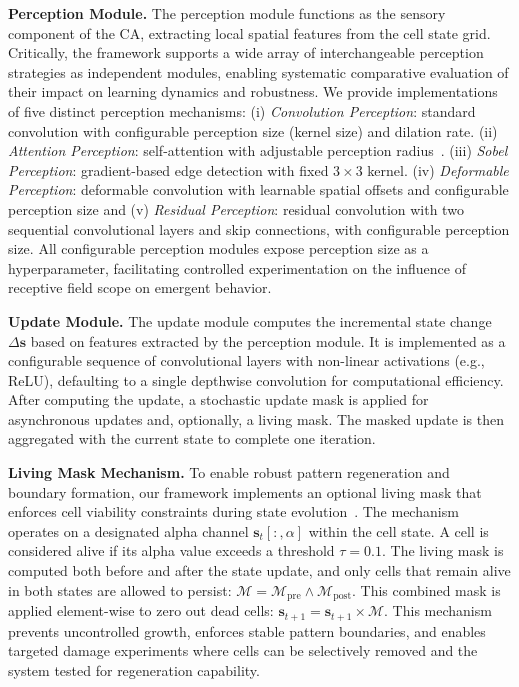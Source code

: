\documentclass[10pt]{article} %
\begin{document}
\noindent\textbf{Perception Module.}
The perception module functions as the sensory component of the CA, extracting local spatial features from the cell state grid. Critically, the framework supports a wide array of interchangeable perception strategies as independent modules, enabling systematic comparative evaluation of their impact on learning dynamics and robustness. We provide implementations of five distinct perception mechanisms: (i) \textit{Convolution Perception}: standard convolution with configurable perception size (kernel size) and dilation rate. (ii) \textit{Attention Perception}: self-attention with adjustable perception radius~\citep{tesfaldet2022attentionbasedneuralcellularautomata}. (iii) \textit{Sobel Perception}: gradient-based edge detection with fixed $3 \times 3$ kernel. (iv) \textit{Deformable Perception}: deformable convolution with learnable spatial offsets and configurable perception size and (v) \textit{Residual Perception}: residual convolution with two sequential convolutional layers and skip connections, with configurable perception size. All configurable perception modules expose perception size as a hyperparameter, facilitating controlled experimentation on the influence of receptive field scope on emergent behavior.

\noindent\textbf{Update Module.}
The update module computes the incremental state change $\Delta \mathbf{s}$ based on features extracted by the perception module. It is implemented as a configurable sequence of convolutional layers with non-linear activations (e.g., ReLU), defaulting to a single depthwise convolution for computational efficiency. After computing the update, a stochastic update mask is applied for asynchronous updates and, optionally, a living mask. The masked update is then aggregated with the current state to complete one iteration.

\noindent\textbf{Living Mask Mechanism.}
To enable robust pattern regeneration and boundary formation, our framework implements an optional living mask that enforces cell viability constraints during state evolution~\cite{mordvintsev2020growing}. The mechanism operates on a designated alpha channel $\mathbf{s}_t[:, \alpha]$ within the cell state. A cell is considered alive if its alpha value exceeds a threshold $\tau = 0.1$. The living mask is computed both before and after the state update, and only cells that remain alive in both states are allowed to persist: $\mathcal{M} = \mathcal{M}_{\text{pre}} \land \mathcal{M}_{\text{post}}$. This combined mask is applied element-wise to zero out dead cells: $\mathbf{s}_{t+1} = \mathbf{s}_{t+1} \times \mathcal{M}$. This mechanism prevents uncontrolled growth, enforces stable pattern boundaries, and enables targeted damage experiments where cells can be selectively removed and the system tested for regeneration capability.
\end{document}
